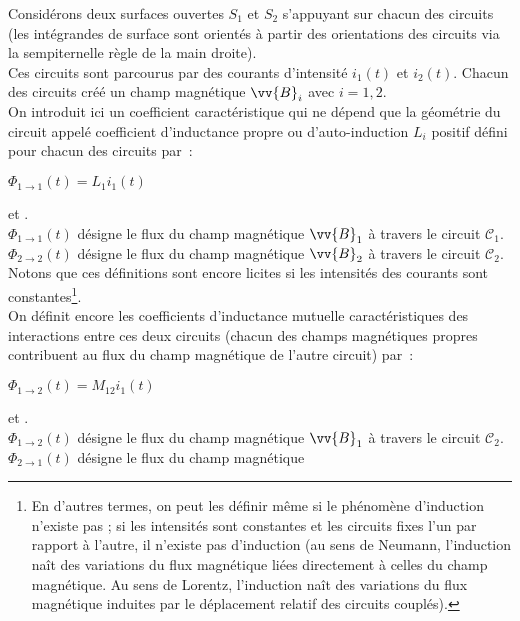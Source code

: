 \documentclass{article}
\newcommand{\mathcolorbox}[2]{\colorbox{#1}{$#2$}}
\renewcommand\overrightarrow{\vv}
\begin{document}
Considérons deux surfaces ouvertes $S_{1}$ et $S_{2}$ s'appuyant sur
chacun des circuits (les intégrandes de surface sont orientés à
partir des orientations des
circuits via la sempiternelle règle de la main droite). \\
Ces circuits sont parcourus par des courants d'intensité $i_{1}\left(t\right)$
et $i_{2}\left(t\right)$.
Chacun des circuits créé un champ magnétique $\overrightarrow{B}_{i}$ avec $i=1,2$. \\
On introduit ici un coefficient caractéristique qui ne dépend que la
géométrie du circuit appelé coefficient d'inductance propre ou d'auto-induction $L_{i}$  positif défini pour chacun des circuits par : \\
\centerline{\mathcolorbox{gray!20}{\Phi_{1\rightarrow 1}(t) = L_{1}i_{1}(t)}} et
. \\
$\Phi_{1\rightarrow 1}\left(t\right)$ désigne le flux du champ magnétique
$\overrightarrow{B}_{1}$ à travers le circuit $\mathcal{C}_{1}$. \\
$\Phi_{2\rightarrow 2}\left(t\right)$ désigne le flux du champ magnétique
$\overrightarrow{B}_{2}$ à travers le circuit $\mathcal{C}_{2}$. \\
Notons que ces définitions sont encore licites si les intensités des
courants sont constantes\footnote{En d'autres termes, on peut les
définir même si le phénomène d'induction n'existe pas ; si les
intensités sont constantes et les circuits fixes l'un par rapport à
l'autre, il n'existe pas d'induction (au sens de Neumann,
l'induction naît des variations du flux magnétique liées directement
à celles du champ magnétique. Au sens de Lorentz, l'induction naît
des variations du flux magnétique induites par le déplacement
relatif des circuits couplés).}. \\
On définit encore les coefficients d'inductance mutuelle
caractéristiques des interactions entre ces deux circuits (chacun
des champs magnétiques propres contribuent au flux du champ
magnétique de l'autre circuit) par : \\
\centerline{\mathcolorbox{gray!20}{\Phi_{1\rightarrow 2}(t) = M_{12}i_{1}(t)}} et
. \\
$\Phi_{1\rightarrow 2}\left(t\right)$ désigne le flux du champ magnétique
$\overrightarrow{B}_{1}$ à travers le circuit $\mathcal{C}_{2}$. \\
$\Phi_{2\rightarrow 1}\left(t\right)$ désigne le flux du champ magnétique
\end{document}
